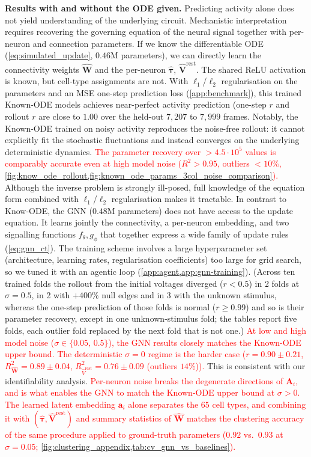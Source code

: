 \documentclass{article}
\begin{document}
\textbf{Results with and without the ODE given.}
Predicting activity alone does not yield understanding of the underlying
circuit. Mechanistic interpretation requires recovering the governing
equation of the neural signal together with per-neuron and
connection parameters. If we know the differentiable ODE (\cref{eq:simulated_update}, $0.46$M parameters), we can directly learn the connectivity weights $\hat{\mathbf{W}}$ and the per-neuron $\hat{\boldsymbol{\tau}}$, $\hat{\mathbf{V}}^{\mathrm{rest}}$. The shared ReLU
activation is known, but cell-type assignments are not. With $\ell_1$/$\ell_2$ regularisation on the parameters and an
MSE one-step prediction loss (\cref{app:benchmark}), this trained 
Known-ODE models achieves near-perfect activity prediction (one-step $r$ and {\color{revised}rollout $r$ are close to $1.00$ over the held-out $7{,}207$ to $7{,}999$ frames.} Notably, the Known-ODE trained on noisy activity reproduces the noise-free rollout: it cannot explicitly fit the stochastic fluctuations and instead converges on the underlying
deterministic dynamics. \textcolor{red}{The parameter recovery over $> 4.5\cdot 10^5$
values is comparably accurate even at high model noise ($R^2>0.95$, outliers $<10\%$, \cref{fig:know_ode_rollout,fig:known_ode_params_3col_noise_comparison}).}
Although the inverse problem is strongly ill-posed, full knowledge
of the equation form combined with $\ell_1$/$\ell_2$ regularisation
makes it tractable.
In contrast to Know-ODE, the GNN ($0.48$M parameters) does not have access to the update equation. It learns jointly the connectivity, a per-neuron embedding, and two
signalling functions $f_\theta, g_\phi$ that together express a wide
family of update rules (\cref{eq:gnn_ct}). The training scheme involves a large hyperparameter set (architecture, learning rates, regularisation coefficients) too large
for grid search, so we tuned it with an agentic loop (\cref{app:agent,app:gnn-training}). {\color{revised}(Across ten trained folds the rollout from the initial voltages diverged ($r<0.5$) in 2 folds at $\sigma=0.5$, in 2 with $+400\%$ null edges and in 3 with the unknown stimulus, whereas the one-step prediction of those folds is normal ($r\geq0.99$) and so is their parameter recovery, except in one unknown-stimulus fold; the tables report five folds, each outlier fold replaced by the next fold that is not one.)} \textcolor{red}{At low and high model noise ($\sigma \in \{0.05,\,0.5\}$), the GNN results closely matches the Known-ODE upper bound.} \textcolor{red}{The deterministic
$\sigma=0$ regime is the harder case ($r=0.90\pm 0.21$,
$R^2_{\hat{\mathbf{W}}}=0.89\pm 0.04$, $R^2_{\hat{V}^{\mathrm{rest}}}=0.76\pm 0.09$ (outliers $14\%$)).} This is consistent with our identifiability analysis. \textcolor{red}{Per-neuron
noise breaks the degenerate directions of $\mathbf{A}_i$, and is
what enables the GNN to match the Known-ODE upper bound at
$\sigma > 0$.} \textcolor{red}{The learned latent embedding $\mathbf{a}_i$ alone separates the $65$
cell types, and combining it with $(\hat{\boldsymbol{\tau}},
\hat{\mathbf{V}}^{\mathrm{rest}})$ and summary statistics of
$\hat{\mathbf{W}}$ matches the clustering accuracy of the same
procedure applied to ground-truth parameters
($0.92$ vs.\ $0.93$ at $\sigma = 0.05$;
\cref{fig:clustering_appendix,tab:cv_gnn_vs_baselines}).}
\end{document}
